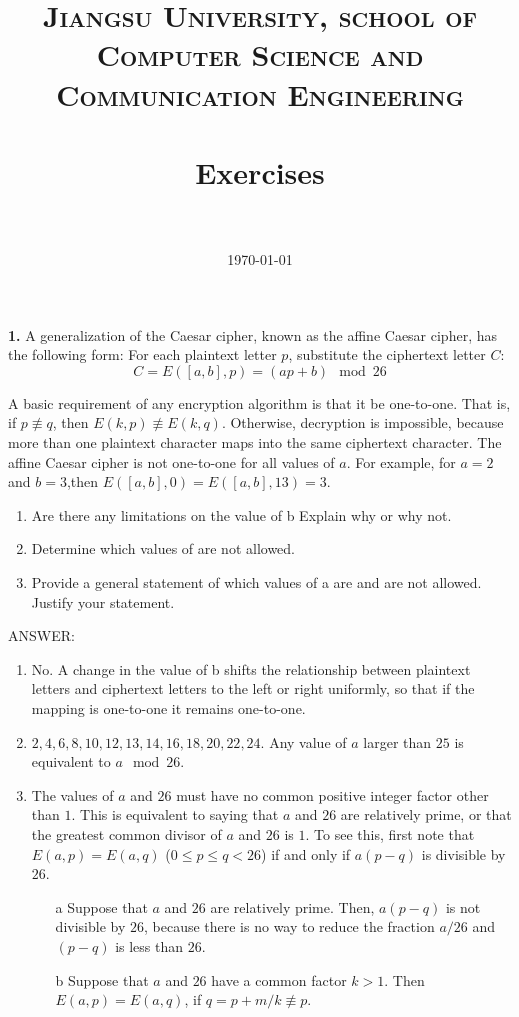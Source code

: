 \documentclass[paper=a4, fontsize=11pt]{scrartcl} %
\title{ 
\normalfont \normalsize
\textsc{Jiangsu University, school of Computer Science and Communication Engineering} \\ [25pt] %
\horrule{0.5pt} \\[0.4cm] %
\huge Exercises \\ %
\horrule{2pt} \\[0.5cm] %
}
\date{\normalsize\today} %
\numberwithin{equation}{section} %
\numberwithin{figure}{section} %
\numberwithin{table}{section} %
\begin{document}
\maketitle %


\textbf{1.} A generalization of the Caesar cipher, known as the affine Caesar cipher, has the following form: For each plaintext letter $p$, substitute the ciphertext letter $C$:
$$C = E([a, b], p) = (ap + b) \mod 26$$

A basic requirement of any encryption algorithm is that it be
one-to-one. That is, if $p\not\equiv q$, then $E(k,p)\not\equiv E(k,q)$. Otherwise, decryption is impossible, because more than one plaintext character maps into the same ciphertext character. The affine Caesar cipher is not one-to-one for all values of $a$. For example, for $a=2$ and $b=3$,then $E([a,b],0)=E([a,b],13)=3$.

\begin{enumerate}
\item Are there any limitations on the value of b Explain why or why not.
\item Determine which values of are not allowed.
\item Provide a general statement of which values of a are and are not allowed. Justify your statement.
\end{enumerate}

ANSWER:

\begin{enumerate}
\item No. A change in the value of b shifts the relationship between
  plaintext letters and ciphertext letters to the left or right
  uniformly, so that if the mapping is one-to-one it remains
  one-to-one.
\item $2,4,6,8,10,12,13,14,16,18,20,22,24$. Any value of $a$ larger than $25$ is equivalent to $a \mod 26$.
\item The values of $a$ and $26$ must have no common positive integer
  factor other than $1$. This is equivalent to saying that $a$ and $26$ are
  relatively prime, or that the greatest common divisor of $a$ and $26$ is
  $1$. To see this, first note that $E(a,p) = E(a,q)$ ($0\le p \le
  q<26$) if and only if $a(p-q)$ is divisible by $26$.
  \begin{enumerate}
  \item[a] Suppose that $a$ and $26$ are relatively prime. Then, $a(p-q)$ is not divisible by $26$, because there is no way to reduce the fraction $a/26$ and $(p-q)$ is less than $26$.
  \item[b] Suppose that $a$ and $26$ have a common factor $k>1$. Then
    $E(a,p)=E(a,q)$, if $q=p+m/k\not\equiv p$.
  \end{enumerate}
\end{enumerate}
\end{document}
